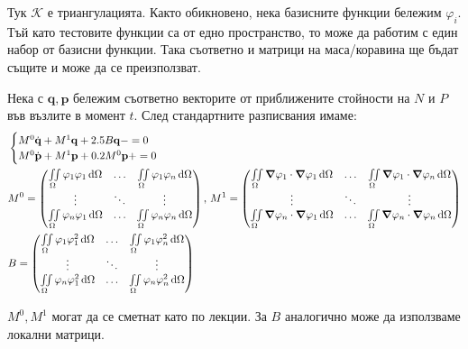 \documentclass[bulgarian, 12pt]{article}
\begin{document}
\begin{large}
Тук $\mathcal{K}$ е триангулацията. 
Както обикновено, нека базисните функции бележим $\varphi_i$. 
Тъй като тестовите функции са от едно пространство, то може да работим с един набор от базисни функции.
Така съответно и матрици на маса/коравина ще бъдат същите и може да се преизползват.

Нека с $\mathbf{q}, \mathbf{p}$ бележим съответно векторите от приближените стойности на $N$ и $P$ във възлите в момент $t$.
След стандартните разписвания имаме: 
\begin{align*}
  &\begin{cases}
	  M^0\dot{\mathbf{q}} + M^1\mathbf{q} + 2.5 B\mathbf{q} - = 0 \\
    M^0\dot{\mathbf{p}} + M^1\mathbf{p} + 0.2 M^0\mathbf{p} + = 0 \\
	\end{cases} \\
  &M^0=\begin{pmatrix}
	\iint\limits_{\Omega} \varphi_1 \varphi_1 \,\dd\Omega & \hdots & \iint\limits_{\Omega} \varphi_1 \varphi_n \,\dd\Omega \\
	\vdots & \ddots & \vdots \\
	\iint\limits_{\Omega} \varphi_n \varphi_1 \,\dd\Omega & \hdots & \iint\limits_{\Omega} \varphi_n \varphi_n \,\dd\Omega \\
	\end{pmatrix},\,
  M^1=\begin{pmatrix}
	\iint\limits_{\Omega} \grad \varphi_1 \cdot \grad \varphi_1 \,\dd\Omega & \hdots & \iint\limits_{\Omega} \grad \varphi_1 \cdot \grad \varphi_n \,\dd\Omega \\
	\vdots & \ddots & \vdots \\
	\iint\limits_{\Omega} \grad \varphi_n \cdot \grad \varphi_1 \,\dd\Omega & \hdots & \iint\limits_{\Omega} \grad \varphi_n \cdot \grad \varphi_n \,\dd\Omega \\
	\end{pmatrix}\\
  &B=\begin{pmatrix}
    \iint\limits_{\Omega} \varphi_1 \varphi_1^2 \,\dd\Omega & \hdots & \iint\limits_{\Omega} \varphi_1 \varphi_n^2 \,\dd\Omega \\
    \vdots & \ddots & \vdots \\
    \iint\limits_{\Omega} \varphi_n \varphi_1^2 \,\dd\Omega & \hdots & \iint\limits_{\Omega} \varphi_n \varphi_n^2 \,\dd\Omega \\
    \end{pmatrix}  
\end{align*}

$M^0, M^1$ могат да се сметнат като по лекции. За $B$ аналогично може да използваме локални матрици.
\end{large}
\end{document}
